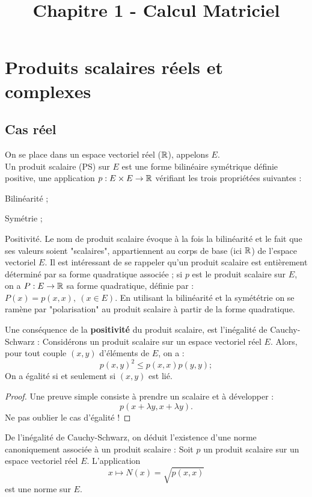 

\title{Chapitre 1 - Calcul Matriciel}


\maketitle
\section{Produits scalaires réels et complexes}
\subsection{Cas réel}
\bd
On se place dans un espace vectoriel réel ($\mathbb{R}$), appelons $E$. \\
Un produit scalaire (PS) sur $E$ est une forme bilinéaire symétrique définie positive, \ie une application $p : E \times E \to \mathbb{R}$ vérifiant les trois propriétées suivantes : 
	\ben 
		\item Bilinéarité ;
		\item Symétrie ; 
		\item Positivité.
	\een
\ed
\medskip
\bn
Le nom de produit scalaire évoque à la fois la bilinéarité et le fait que ses valeurs soient "scalaires", \ie appartiennent au corps de base (ici $\mathbb{R}$) de l'espace vectoriel $E$.
\en
\medskip
Il est intéressant de se rappeler qu'un produit scalaire est entièrement déterminé par sa forme quadratique associée ; si $p$ est le produit scalaire sur $E$, on a $P : E \to \mathbb{R}$ sa forme quadratique, définie par : $P(x) = p(x,x), ~ (x \in E).$ En utilisant la bilinéarité et la symététrie on se ramène par "polarisation" au produit scalaire à partir de la forme quadratique.
\medskip

Une conséquence de la \textbf{positivité} du produit scalaire, est l'inégalité de Cauchy-Schwarz :
Considérons un produit scalaire sur un espace vectoriel réel $E$. Alors, pour tout couple $(x,y)$ d'éléments de $E$, on a : $$p(x,y)^2 \leq p(x,x)p(y,y);$$
On a égalité si et seulement si $(x,y)$ est lié.
\ep
\begin{proof}
Une preuve simple consiste à prendre un scalaire et à développer : $$p(x+\lambda y, x + \lambda y).$$ Ne pas oublier le cas d'égalité !
\end{proof}

\bn
De l'inégalité de Cauchy-Schwarz, on déduit l'existence d'une norme canoniquement associée à un produit scalaire :
\en
{} 
Soit $p$ un produit scalaire sur un espace vectoriel réel $E$. L'application $$\displaystyle x \mapsto N(x) = \sqrt{p(x,x)}$$
est une norme sur $E$.
\ep


